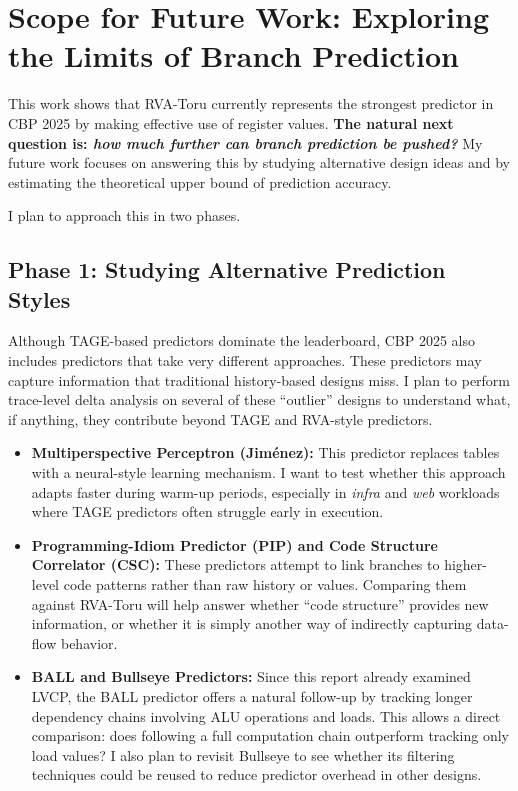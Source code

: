 \documentclass[11pt,a4paper]{article}
\newcommand{\question}[1]{\textbf{\textcolor{blue!40!black}{#1}}}
\begin{document}
\section{Scope for Future Work: Exploring the Limits of Branch Prediction}

This work shows that RVA-Toru currently represents the strongest predictor in CBP 2025 by making effective use of register values.
\question{The natural next question is: \textit{how much further can branch prediction be pushed?}}
My future work focuses on answering this by studying alternative design ideas and by estimating the theoretical upper bound of prediction accuracy.

I plan to approach this in two phases.

\subsection{Phase 1: Studying Alternative Prediction Styles}

Although TAGE-based predictors dominate the leaderboard, CBP 2025 also includes predictors that take very different approaches. These predictors may capture information that traditional history-based designs miss. I plan to perform trace-level delta analysis on several of these “outlier” designs to understand what, if anything, they contribute beyond TAGE and RVA-style predictors.

\begin{itemize}
    \item \textbf{Multiperspective Perceptron (Jiménez):}  
    This predictor replaces tables with a neural-style learning mechanism. I want to test whether this approach adapts faster during warm-up periods, especially in \textit{infra} and \textit{web} workloads where TAGE predictors often struggle early in execution.
    
    \item \textbf{Programming-Idiom Predictor (PIP) and Code Structure Correlator (CSC):}  
    These predictors attempt to link branches to higher-level code patterns rather than raw history or values. Comparing them against RVA-Toru will help answer whether “code structure” provides new information, or whether it is simply another way of indirectly capturing data-flow behavior.
    
    \item \textbf{BALL and Bullseye Predictors:}  
    Since this report already examined LVCP, the BALL predictor offers a natural follow-up by tracking longer dependency chains involving ALU operations and loads. This allows a direct comparison: does following a full computation chain outperform tracking only load values? I also plan to revisit Bullseye to see whether its filtering techniques could be reused to reduce predictor overhead in other designs.
\end{itemize}
\end{document}
